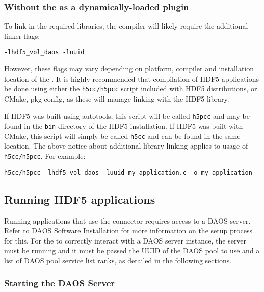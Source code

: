 \documentclass[../users_guide.tex]{subfiles}
\begin{document}
\subsubsection{Without the \dvc{} as a dynamically-loaded plugin}

To link in the required libraries, the compiler will likely require the
additional linker flags:

\begin{verbatim}
-lhdf5_vol_daos -luuid
\end{verbatim}

However, these flags may vary depending on platform, compiler and installation
location of the \dvc{}. It is highly recommended that compilation
of HDF5 \dvc{} applications be done using either the
\texttt{h5cc/h5pcc} script included with HDF5 distributions, or CMake,
pkg-config, as these will manage linking with the HDF5 library.

If HDF5 was built using autotools, this script will be called \texttt{h5pcc} and
may be found in the \texttt{bin} directory of the HDF5 installation. If HDF5
was built with CMake, this script will simply be called \texttt{h5cc} and can
be found in the same location. The above notice about additional library
linking applies to usage of \texttt{h5cc/h5pcc}. For example:
\begin{verbatim}
h5cc/h5pcc -lhdf5_vol_daos -luuid my_application.c -o my_application
\end{verbatim}

\subsection{Running HDF5 \dvc{} applications}
\label{running_daos_vol_apps}

Running applications that use the \dvc{} connector requires access to a DAOS
server. Refer to
\href{https://daos-stack.github.io/admin/installation/}{DAOS Software Installation}
for more information on the setup process for this. For the \dvc{}
to correctly interact with a DAOS server instance, the server must be \hyperref[sec:daos_serv_start]{running} and it must be passed the UUID of the
DAOS pool to use and a list of DAOS pool service list ranks, as detailed in the
following sections.

\subsubsection{Starting the DAOS Server}
\label{sec:daos_serv_start}
\end{document}
